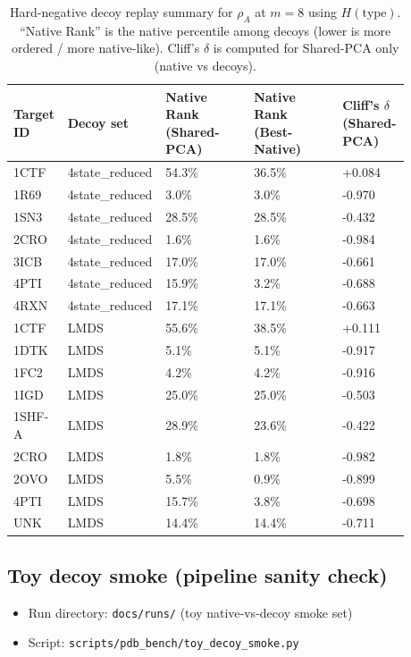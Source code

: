 \begin{table}[t]
  \centering
  \caption{Hard-negative decoy replay summary for $\rho_A$ at $m=8$ using $H(\mathrm{type})$. ``Native Rank'' is the native percentile among decoys (lower is more ordered / more native-like). Cliff's $\delta$ is computed for Shared-PCA only (native vs decoys).}
  \label{tab:decoy_replay_axis_ablation}
  {%
  \scriptsize
  \setlength{\tabcolsep}{4pt}
  \renewcommand{\arraystretch}{1.10}
  \begin{tabular}{p{0.10\linewidth}p{0.18\linewidth}p{0.22\linewidth}p{0.22\linewidth}p{0.16\linewidth}}
    \toprule
    Target ID & Decoy set & Native Rank (Shared-PCA) & Native Rank (Best-Native) & Cliff's $\delta$ (Shared-PCA) \\
    \midrule
    1CTF & 4state\_reduced & 54.3\% & 36.5\% & +0.084 \\
    1R69 & 4state\_reduced & 3.0\% & 3.0\% & -0.970 \\
    1SN3 & 4state\_reduced & 28.5\% & 28.5\% & -0.432 \\
    2CRO & 4state\_reduced & 1.6\% & 1.6\% & -0.984 \\
    3ICB & 4state\_reduced & 17.0\% & 17.0\% & -0.661 \\
    4PTI & 4state\_reduced & 15.9\% & 3.2\% & -0.688 \\
    4RXN & 4state\_reduced & 17.1\% & 17.1\% & -0.663 \\
    \midrule
    1CTF & LMDS & 55.6\% & 38.5\% & +0.111 \\
    1DTK & LMDS & 5.1\% & 5.1\% & -0.917 \\
    1FC2 & LMDS & 4.2\% & 4.2\% & -0.916 \\
    1IGD & LMDS & 25.0\% & 25.0\% & -0.503 \\
    1SHF-A & LMDS & 28.9\% & 23.6\% & -0.422 \\
    2CRO & LMDS & 1.8\% & 1.8\% & -0.982 \\
    2OVO & LMDS & 5.5\% & 0.9\% & -0.899 \\
    4PTI & LMDS & 15.7\% & 3.8\% & -0.698 \\
    UNK & LMDS & 14.4\% & 14.4\% & -0.711 \\
    \bottomrule
  \end{tabular}
  }%
\end{table}

\subsection*{Toy decoy smoke (pipeline sanity check)}
\begin{itemize}
  \item Run directory: \texttt{docs/runs/} (toy native-vs-decoy smoke set)
  \item Script: \texttt{scripts/pdb\_bench/toy\_decoy\_smoke.py}
\end{itemize}

